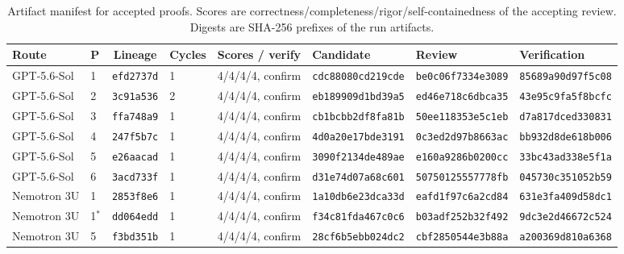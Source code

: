 \begin{table}[htbp]
  \caption{Artifact manifest for accepted proofs. Scores are correctness/completeness/rigor/self-containedness of the accepting review. Digests are SHA-256 prefixes of the run artifacts.}
  \label{tab:manifest}
  \centering
  \scriptsize\setlength{\tabcolsep}{5.5pt}
  \begin{tabular}{@{}llclc lll@{}}
    \toprule
    Route & P & Lineage & Cycles & Scores / verify & Candidate & Review & Verification \\
    \midrule
    GPT-5.6-Sol & 1 & \texttt{efd2737d} & 1 & 4/4/4/4, confirm & \texttt{cdc88080cd219cde} & \texttt{be0c06f7334e3089} & \texttt{85689a90d97f5c08} \\
    GPT-5.6-Sol & 2 & \texttt{3c91a536} & 2 & 4/4/4/4, confirm & \texttt{eb189909d1bd39a5} & \texttt{ed46e718c6dbca35} & \texttt{43e95c9fa5f8bcfc} \\
    GPT-5.6-Sol & 3 & \texttt{ffa748a9} & 1 & 4/4/4/4, confirm & \texttt{cb1bcbb2df8fa81b} & \texttt{50ee118353e5c1eb} & \texttt{d7a817dced330831} \\
    GPT-5.6-Sol & 4 & \texttt{247f5b7c} & 1 & 4/4/4/4, confirm & \texttt{4d0a20e17bde3191} & \texttt{0c3ed2d97b8663ac} & \texttt{bb932d8de618b006} \\
    GPT-5.6-Sol & 5 & \texttt{e26aacad} & 1 & 4/4/4/4, confirm & \texttt{3090f2134de489ae} & \texttt{e160a9286b0200cc} & \texttt{33bc43ad338e5f1a} \\
    GPT-5.6-Sol & 6 & \texttt{3acd733f} & 1 & 4/4/4/4, confirm & \texttt{d31e74d07a68c601} & \texttt{50750125557778fb} & \texttt{045730c351052b59} \\
    \midrule
    Nemotron 3U & 1 & \texttt{2853f8e6} & 1 & 4/4/4/4, confirm & \texttt{1a10db6e23dca33d} & \texttt{eafd1f97c6a2cd84} & \texttt{631e3fa409d58dc1} \\
    Nemotron 3U & 1$^{*}$ & \texttt{dd064edd} & 1 & 4/4/4/4, confirm & \texttt{f34c81fda467c0c6} & \texttt{b03adf252b32f492} & \texttt{9dc3e2d46672c524} \\
    Nemotron 3U & 5 & \texttt{f3bd351b} & 1 & 4/4/4/4, confirm & \texttt{28cf6b5ebb024dc2} & \texttt{cbf2850544e3b88a} & \texttt{a200369d810a6368} \\
    \bottomrule
  \end{tabular}
\end{table}

